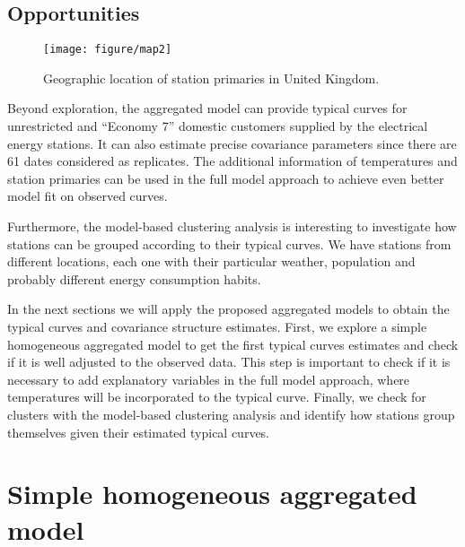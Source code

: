 \subsection{Opportunities}
\label{sec:oport}


\begin{figure}[t]
  \centering
  \texttt{[image: figure/map2]}
  \caption{Geographic location of station primaries in United Kingdom.}
  \label{fig:map}
\end{figure}



Beyond exploration, the aggregated model can provide typical curves for unrestricted and ``Economy 7'' domestic customers supplied by the electrical energy stations. It can also estimate precise covariance parameters since there are 61 dates considered as replicates. The additional information of temperatures and station primaries can be used in the full model approach to achieve even better model fit on observed curves.

Furthermore, the model-based clustering analysis is interesting to investigate how stations can be grouped according to their typical curves. We have stations from different locations, each one with their particular weather, population and probably different energy consumption habits.

In the next sections we will apply the proposed aggregated models to obtain the typical curves and covariance structure estimates. First, we explore a simple homogeneous aggregated model to get the first typical curves estimates and check if it is well adjusted to the observed data. This step is important to check if it is necessary to add explanatory variables in the full model approach, where temperatures will be incorporated to the typical curve. Finally, we check for clusters with the model-based clustering analysis and identify how stations group themselves given their estimated typical curves.


















\section{Simple homogeneous aggregated model}
\label{sec:gavin-homog}






